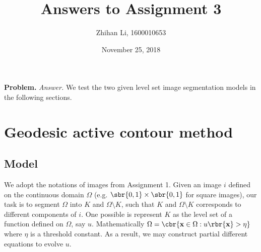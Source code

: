 \documentclass[english, nochinese]{pnote}
\title{Answers to Assignment 3}
\author{Zhihan Li, 1600010653}
\date{November 25, 2018}
\begin{document}
\maketitle

\textbf{Problem.} \textit{Answer.} We test the two given level set image segmentation models in the following sections.

\section{Geodesic active contour method}

\subsection{Model}

We adopt the notations of images from Assignment 1. Given an image $i$ defined on the continuous domain $\Omega$ (e.g. $ \sbr{ 0, 1 } \times \sbr{ 0, 1 } $ for square images), our task is to segment $\Omega$ into $K$ and $ \Omega \setminus K $, such that $K$ and $ \Omega \setminus K $ corresponds to different components of $i$. One possible is represent $K$ as the level set of a function defined on $\Omega$, say $u$. Mathematically $ \Omega = \cbr{ \mathbf{x} \in \Omega : u \rbr{\mathbf{x}} > \eta } $ where $\eta$ is a threshold constant. As a result, we may construct partial different equations to evolve $u$.
\end{document}
